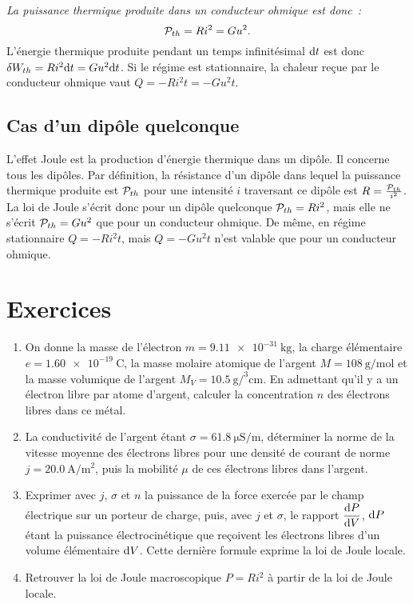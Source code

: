 \emph{La puissance thermique produite dans un conducteur ohmique est donc~:}
\begin{equation}\label{eq:loidejoule}
\P_{th} = Ri^2=Gu^2.
\end{equation}
L'énergie thermique produite pendant un temps infinitésimal \(\D t\) est donc \(\delta W_{th} = Ri^2 \D t = Gu^2 \D t\). Si le régime est stationnaire, la chaleur reçue par le conducteur ohmique vaut \(Q = -Ri^2 t = -Gu^2 t\).

\subsection{Cas d'un dipôle quelconque}

L'effet Joule est la production d'énergie thermique dans un dipôle. Il concerne tous les dipôles. Par définition, la résistance d'un dipôle dans lequel la puissance thermique produite est \(\P_{th}\) pour une intensité \(i\) traversant ce dipôle est \(R = \frac{\P_{th}}{i^2}\). La loi de Joule s'écrit donc pour un dipôle quelconque \(\P_{th} = Ri^2\), mais elle ne s'écrit \(\P_{th} = Gu^2\) que pour un conducteur ohmique. De même, en régime stationnaire \(Q = -Ri^2 t\), mais \(Q=-Gu^2t\) n'est valable que pour un conducteur ohmique.

\section{Exercices}
\begin{exercice}
  \begin{enumerate}
    \item On donne la masse de l'électron \(m=\SI{9.11e-31}{\kilogram}\), la charge élémentaire \(e = \SI{1.60e-19}{\coulomb}\), la masse molaire atomique de l'argent \(M=\SI{108}{\gram\per\mole}\) et la masse volumique de l'argent \(M_V = \SI{10.5}{\gram\per\cubed\centi\meter}\). En admettant qu'il y a un électron libre par atome d'argent, calculer la concentration \(n\) des électrons libres dans ce métal.
    \item La conductivité de l'argent étant \(\sigma = \SI{61.8}{\micro\siemens\per\meter}\), déterminer la norme de la vitesse moyenne des électrons libres pour une densité de courant de norme \(j=\SI{20.0}{\ampere\per\meter\squared}\), puis la mobilité \(\mu\) de ces électrons libres dans l'argent.
    \item Exprimer avec \(j\), \(\sigma\) et \(n\) la puissance de la force exercée par le champ électrique sur un porteur de charge, puis, avec \(j\) et \(\sigma\), le rapport \(\derived{P}{V}\), \(\D P\) étant la puissance électrocinétique que reçoivent les électrons libres d'un volume élémentaire \(\D V\). Cette dernière formule exprime la loi de Joule locale.
    \item Retrouver la loi de Joule macroscopique \(P=Ri^2\) à partir de la loi de Joule locale.
  \end{enumerate}
\end{exercice}

